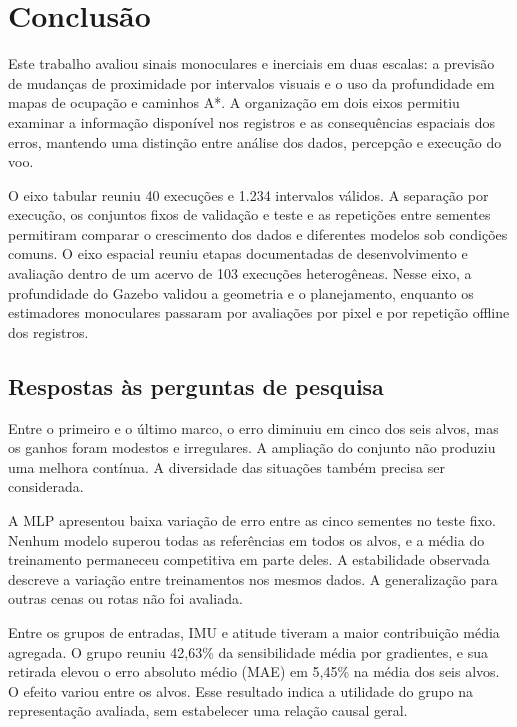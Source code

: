 \chapter{Conclusão}\label{cap:conclusoes}



Este trabalho avaliou sinais monoculares e inerciais em duas escalas: a previsão de mudanças de proximidade por intervalos visuais e o uso da profundidade em mapas de ocupação e caminhos A*. A organização em dois eixos permitiu examinar a informação disponível nos registros e as consequências espaciais dos erros, mantendo uma distinção entre análise dos dados, percepção e execução do voo.

O eixo tabular reuniu 40 execuções e 1.234 intervalos válidos. A separação por execução, os conjuntos fixos de validação e teste e as repetições entre sementes permitiram comparar o crescimento dos dados e diferentes modelos sob condições comuns. O eixo espacial reuniu etapas documentadas de desenvolvimento e avaliação dentro de um acervo de 103 execuções heterogêneas. Nesse eixo, a profundidade do Gazebo validou a geometria e o planejamento, enquanto os estimadores monoculares passaram por avaliações por pixel e por repetição offline dos registros.

\section{Respostas às perguntas de pesquisa}

Entre o primeiro e o último marco, o erro diminuiu em cinco dos seis alvos, mas os ganhos foram modestos e irregulares. A ampliação do conjunto não produziu uma melhora contínua. A diversidade das situações também precisa ser considerada.

A MLP apresentou baixa variação de erro entre as cinco sementes no teste fixo. Nenhum modelo superou todas as referências em todos os alvos, e a média do treinamento permaneceu competitiva em parte deles. A estabilidade observada descreve a variação entre treinamentos nos mesmos dados. A generalização para outras cenas ou rotas não foi avaliada.

Entre os grupos de entradas, IMU e atitude tiveram a maior contribuição média agregada. O grupo reuniu 42,63\% da sensibilidade média por gradientes, e sua retirada elevou o erro absoluto médio (MAE) em 5,45\% na média dos seis alvos. O efeito variou entre os alvos. Esse resultado indica a utilidade do grupo na representação avaliada, sem estabelecer uma relação causal geral.

